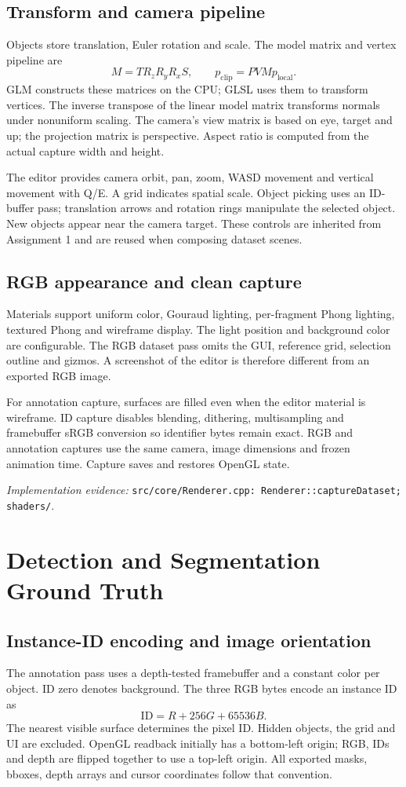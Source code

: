 \documentclass[12pt,a4paper]{article}
\newcommand{\code}[1]{{\small\nolinkurl{#1}}}
\newcommand{\source}[1]{\par{\raggedright\footnotesize\textit{Implementation evidence:} \code{#1}.\par}}
\begin{document}
\subsection{Transform and camera pipeline}
Objects store translation, Euler rotation and scale. The model matrix and vertex pipeline are
\begin{equation}
M=T R_z R_y R_x S,\qquad p_{\mathrm{clip}}=PVMp_{\mathrm{local}}.
\end{equation}
GLM constructs these matrices on the CPU; GLSL uses them to transform vertices. The inverse transpose of the linear model matrix transforms normals under nonuniform scaling. The camera's view matrix is based on eye, target and up; the projection matrix is perspective. Aspect ratio is computed from the actual capture width and height.

The editor provides camera orbit, pan, zoom, WASD movement and vertical movement with Q/E. A grid indicates spatial scale. Object picking uses an ID-buffer pass; translation arrows and rotation rings manipulate the selected object. New objects appear near the camera target. These controls are inherited from Assignment 1 and are reused when composing dataset scenes.

\subsection{RGB appearance and clean capture}
Materials support uniform color, Gouraud lighting, per-fragment Phong lighting, textured Phong and wireframe display. The light position and background color are configurable. The RGB dataset pass omits the GUI, reference grid, selection outline and gizmos. A screenshot of the editor is therefore different from an exported RGB image.

For annotation capture, surfaces are filled even when the editor material is wireframe. ID capture disables blending, dithering, multisampling and framebuffer sRGB conversion so identifier bytes remain exact. RGB and annotation captures use the same camera, image dimensions and frozen animation time. Capture saves and restores OpenGL state.
\source{src/core/Renderer.cpp: Renderer::captureDataset; shaders/}

\section{Detection and Segmentation Ground Truth}
\subsection{Instance-ID encoding and image orientation}
The annotation pass uses a depth-tested framebuffer and a constant color per object. ID zero denotes background. The three RGB bytes encode an instance ID as
\begin{equation}
\mathrm{ID}=R+256G+65536B.
\end{equation}
The nearest visible surface determines the pixel ID. Hidden objects, the grid and UI are excluded. OpenGL readback initially has a bottom-left origin; RGB, IDs and depth are flipped together to use a top-left origin. All exported masks, bboxes, depth arrays and cursor coordinates follow that convention.
\end{document}
